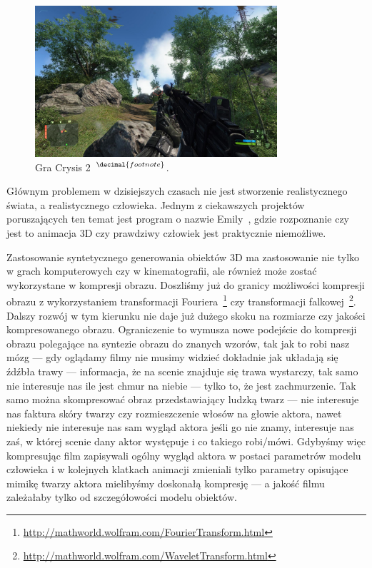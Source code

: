 {{}
\addtocounter{footnote}{1}
\begin{figure}[h!]
  \centering
  \includegraphics[width=0.8\textwidth]{images/Crysis2.JPG}
  \caption[Gra Crysis 2]{Gra Crysis 2~$^{\decimal{footnote}}$.}
\end{figure}
}

Głównym problemem w dzisiejszych czasach nie jest stworzenie realistycznego
świata, a realistycznego człowieka. Jednym z ciekawszych projektów poruszających
ten temat jest program o nazwie Emily~\cite{link01}, gdzie rozpoznanie czy jest
to animacja 3D czy prawdziwy człowiek jest praktycznie niemożliwe.

Zastosowanie syntetycznego generowania obiektów 3D ma zastosowanie nie tylko w
grach komputerowych czy w kinematografii, ale również może zostać wykorzystane w
kompresji obrazu. Doszliśmy już do granicy możliwości kompresji obrazu z
wykorzystaniem transformacji
Fouriera~\footnote{\url{http://mathworld.wolfram.com/FourierTransform.html}}
czy transformacji
falkowej~\footnote{\url{http://mathworld.wolfram.com/WaveletTransform.html}}.
Dalszy rozwój w tym kierunku nie daje już dużego skoku na rozmiarze czy jakości
kompresowanego obrazu. Ograniczenie to wymusza nowe podejście do kompresji
obrazu polegające na syntezie obrazu do znanych wzorów, tak jak to robi nasz
mózg --- gdy oglądamy filmy nie musimy widzieć dokładnie jak układają się źdźbła
trawy --- informacja, że na scenie znajduje się trawa wystarczy, tak samo nie
interesuje nas ile jest chmur na niebie --- tylko to, że jest
zachmurzenie. Tak samo można skompresować obraz przedstawiający ludzką twarz ---
nie interesuje nas faktura skóry twarzy czy rozmieszczenie włosów na głowie
aktora, nawet niekiedy nie interesuje nas sam wygląd aktora jeśli go nie znamy,
interesuje nas zaś, w której scenie dany aktor występuje i co takiego robi/mówi.
Gdybyśmy więc kompresując film zapisywali ogólny wygląd aktora w postaci
parametrów modelu człowieka i w kolejnych klatkach animacji zmieniali tylko
parametry opisujące mimikę twarzy aktora mielibyśmy doskonałą kompresję --- a
jakość filmu zależałaby tylko od szczegółowości modelu obiektów.

